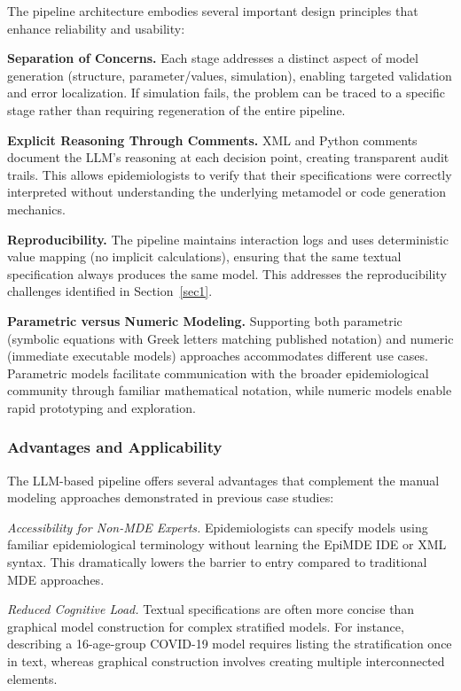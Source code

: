 The pipeline architecture embodies several important design principles that enhance reliability and usability:

\textbf{Separation of Concerns.} Each stage addresses a distinct aspect of model generation (structure, parameter/values, simulation), enabling targeted validation and error localization. If simulation fails, the problem can be traced to a specific stage rather than requiring regeneration of the entire pipeline.

\textbf{Explicit Reasoning Through Comments.} XML and Python comments document the LLM's reasoning at each decision point, creating transparent audit trails. This allows epidemiologists to verify that their specifications were correctly interpreted without understanding the underlying metamodel or code generation mechanics.

\textbf{Reproducibility.} The pipeline maintains interaction logs and uses deterministic value mapping (no implicit calculations), ensuring that the same textual specification always produces the same model. This addresses the reproducibility challenges identified in Section~\ref{sec1}.

\textbf{Parametric versus Numeric Modeling.} Supporting both parametric (symbolic equations with Greek letters matching published notation) and numeric (immediate executable models) approaches accommodates different use cases. Parametric models facilitate communication with the broader epidemiological community through familiar mathematical notation, while numeric models enable rapid prototyping and exploration.

\subsubsection{Advantages and Applicability}

The LLM-based pipeline offers several advantages that complement the manual modeling approaches demonstrated in previous case studies:

\textit{Accessibility for Non-MDE Experts.} Epidemiologists can specify models using familiar epidemiological terminology without learning the EpiMDE IDE or XML syntax. This dramatically lowers the barrier to entry compared to traditional MDE approaches.

\textit{Reduced Cognitive Load.} Textual specifications are often more concise than graphical model construction for complex stratified models. For instance, describing a 16-age-group COVID-19 model requires listing the stratification once in text, whereas graphical construction involves creating multiple interconnected elements.

